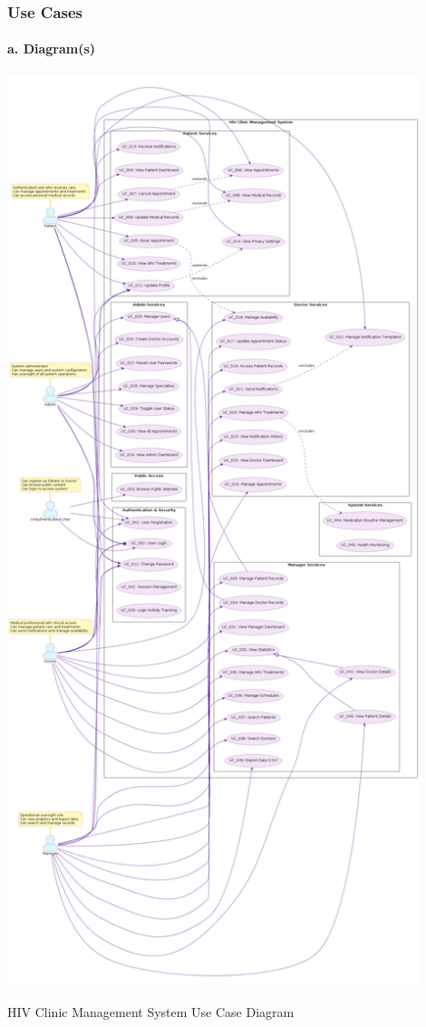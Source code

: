 \documentclass[12pt,a4paper]{article}
\begin{document}
\subsubsection{Use Cases}

\paragraph{a. Diagram(s)}
\centering
\includegraphics[width=0.9\textwidth]{diagrams/use_case_diagram.png}
\caption{HIV Clinic Management System Use Case Diagram}
\label{fig:use-case-diagram}
\end{document}

